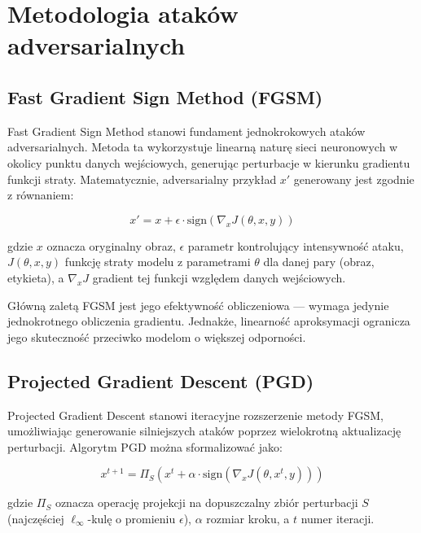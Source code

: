 \documentclass[12pt]{article}
\begin{document}
\section{Metodologia ataków adversarialnych}

\subsection{Fast Gradient Sign Method (FGSM)}

Fast Gradient Sign Method \cite{goodfellow2014explaining} stanowi fundament jednokrokowych ataków adversarialnych. Metoda ta wykorzystuje linearną naturę sieci neuronowych w okolicy punktu danych wejściowych, generując perturbacje w kierunku gradientu funkcji straty. Matematycznie, adversarialny przykład $x'$ generowany jest zgodnie z równaniem:

\begin{equation}
    x' = x + \epsilon \cdot \text{sign}(\nabla_x J(\theta, x, y))
\end{equation}

gdzie $x$ oznacza oryginalny obraz, $\epsilon$ parametr kontrolujący intensywność ataku, $J(\theta, x, y)$ funkcję straty modelu z parametrami $\theta$ dla danej pary (obraz, etykieta), a $\nabla_x J$ gradient tej funkcji względem danych wejściowych.

Główną zaletą FGSM jest jego efektywność obliczeniowa --- wymaga jedynie jednokrotnego obliczenia gradientu. Jednakże, linearność aproksymacji ogranicza jego skuteczność przeciwko modelom o większej odporności.

\subsection{Projected Gradient Descent (PGD)}

Projected Gradient Descent \cite{madry2017towards} stanowi iteracyjne rozszerzenie metody FGSM, umożliwiając generowanie silniejszych ataków poprzez wielokrotną aktualizację perturbacji. Algorytm PGD można sformalizować jako:

\begin{equation}
    x^{t+1} = \Pi_{S}(x^t + \alpha \cdot \text{sign}(\nabla_x J(\theta, x^t, y)))
\end{equation}

gdzie $\Pi_{S}$ oznacza operację projekcji na dopuszczalny zbiór perturbacji $S$ (najczęściej $\ell_\infty$-kulę o promieniu $\epsilon$), $\alpha$ rozmiar kroku, a $t$ numer iteracji.
\end{document}
